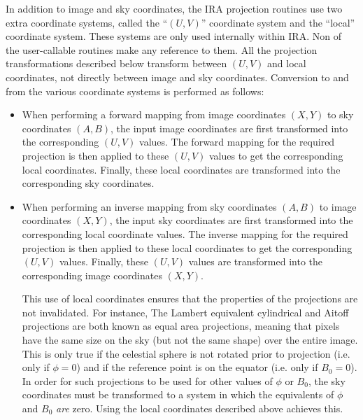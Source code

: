 In addition to image and sky coordinates, the IRA projection routines use two 
extra coordinate systems, called the ``$(U,V)$'' coordinate system and the 
``local'' coordinate system. These systems are only used internally within 
IRA. Non of the user-callable routines make any reference to them. All the 
projection transformations described below transform between $(U,V)$ and local 
coordinates, not directly between image and sky coordinates. Conversion to and 
from the various coordinate systems is performed as follows:

\begin{itemize}

\item When performing a forward mapping from image coordinates $(X,Y)$ to sky
coordinates $(A,B)$, the input image coordinates are first transformed into the
corresponding $(U,V)$ values. The forward mapping for the required projection is
then applied to these $(U,V)$ values to get the corresponding local coordinates.
Finally, these local coordinates are transformed into the corresponding sky
coordinates. 

\item When performing an inverse mapping from sky coordinates $(A,B)$ to image 
coordinates $(X,Y)$, the input sky coordinates are first transformed into 
the corresponding local coordinate values. The inverse mapping for the required 
projection is then applied to these local coordinates to get the corresponding 
$(U,V)$ values. Finally, these $(U,V)$ values are transformed into the 
corresponding image coordinates $(X,Y)$.

This use of local coordinates ensures that the properties of the projections are
not invalidated. For instance, The Lambert equivalent cylindrical and Aitoff
projections are both known as equal area projections, meaning that pixels have
the same size on the sky (but not the same shape) over the entire image. This is
only true if the celestial sphere is not rotated prior to projection (i.e. only
if $\phi=0$) and if the reference point is on the equator (i.e. only if
$B_{0}=0$). In order for such projections to be used for other values of $\phi$
or $B_{0}$, the sky coordinates must be transformed to a system in which the
equivalents of $\phi$ and $B_{0}$ {\em are} zero. Using the local coordinates
described above achieves this. 

\end{itemize}

